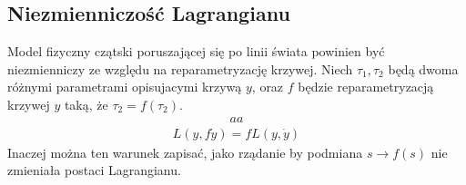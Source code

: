 \subsection{Niezmienniczość Lagrangianu}
Model fizyczny czątski poruszającej się po linii świata
powinien być niezmienniczy ze względu na 
reparametryzację krzywej. Niech $\tau_1,\tau_2$ będą 
dwoma różnymi parametrami opisujacymi krzywą $y$, oraz 
$f$ będzie reparametryzacją krzywej $y$ 
taką, że $\tau_2 = f(\tau_2)$.
\begin{align}
aa
\end{align} 
\begin{align}
 L( y, f \dot{y} ) = f L ( y, \dot{y}  ) 
\end{align} 
Inaczej można ten warunek zapisać, jako rządanie by
podmiana $s \to f(s)$ nie zmieniała postaci Lagrangianu.

